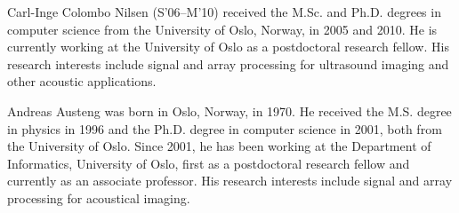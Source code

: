 \documentclass[journal]{IEEEtran}
\begin{document}
\begin{IEEEbiography}{Carl-Inge Colombo Nilsen}
(S’06–M’10) received the M.Sc. and Ph.D. degrees in computer science from the University of Oslo, Norway, in 2005 and 2010. He is currently working at the University of Oslo as a postdoctoral research fellow. His research interests include signal and array processing for ultrasound imaging and other acoustic applications.
\end{IEEEbiography}


\begin{IEEEbiography}{Andreas Austeng}
was born in Oslo, Norway, in 1970. He received the M.S. degree in physics in 1996 and the Ph.D. degree in computer science in 2001, both from the University of Oslo. Since 2001, he has been working at the Department of Informatics, University of Oslo, first as a postdoctoral research fellow and currently as an associate professor. His research interests include signal and array processing for acoustical imaging.
\end{IEEEbiography}

\end{document}
